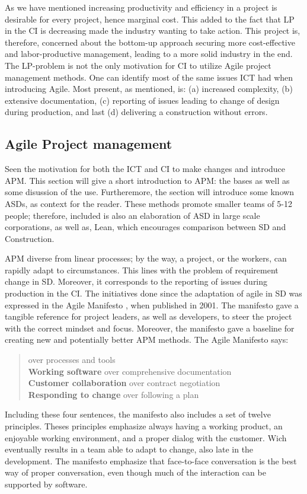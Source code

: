 As we have mentioned increasing productivity and efficiency in a project is desirable for every project, hence marginal cost. This added to the fact that LP in the CI is decreasing made the industry wanting to take action. This project is, therefore, concerned about the bottom-up approach securing more cost-effective and labor-productive management, leading to a more solid industry in the end. The LP-problem is not the only motivation for CI to utilize Agile project management methods. One can identify most of the same issues ICT had when introducing Agile. Most present, as mentioned, is: (a) increased complexity, (b) extensive documentation, (c) reporting of issues leading to change of design during production, and last (d) delivering a construction without errors.

\subsection{Agile Project management}
Seen the motivation for both the ICT and CI to make changes and introduce APM. This section will give a short introduction to APM: the bases as well as some disussion of the use. Furtheremore, the section will introduce some known ASDs, as context for the reader. These methods promote smaller teams of 5-12 people; therefore, included is also an elaboration of ASD in large scale corporations, as well as, Lean, which encourages comparison between SD and Construction. 

APM diverse from linear processes; by the way, a project, or the workers, can rapidly adapt to circumstances. This lines with the problem of requirement change in SD. Moreover, it corresponds to the reporting of issues during production in the CI. The initiatives done since the adaptation of agile in SD was expressed in the Agile Manifesto \cite{agile_manifesto}, when published in 2001. The manifesto gave a tangible reference for project leaders, as well as developers, to steer the project with the correct mindset and focus. Moreover, the manifesto gave a baseline for creating new and potentially better APM methods. The Agile Manifesto says:
\begin{quotation}
     over processes and tools \\
    {\bf Working software} over comprehensive documentation \\
    {\bf Customer collaboration} over contract negotiation \\
    {\bf Responding to change} over following a plan \\
\end{quotation}
Including these four sentences, the manifesto also includes a set of twelve principles. Theses principles emphasize always having a working product, an enjoyable working environment, and a proper dialog with the customer. Wich eventually results in a team able to adapt to change,  also late in the development. The manifesto emphasize that face-to-face conversation is the best way of proper conversation, even though much of the interaction can be supported by software.

